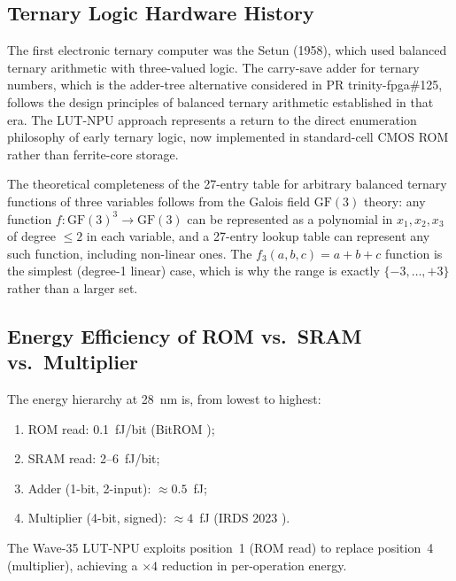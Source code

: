 \subsection{Ternary Logic Hardware History}

The first electronic ternary computer was the Setun (1958), which used
balanced ternary arithmetic with three-valued logic.  The carry-save adder
for ternary numbers, which is the adder-tree alternative considered in
PR trinity-fpga\#125, follows the design principles of balanced ternary
arithmetic established in that era.  The LUT-NPU approach represents a
return to the direct enumeration philosophy of early ternary logic, now
implemented in standard-cell CMOS ROM rather than ferrite-core storage.

The theoretical completeness of the 27-entry table for arbitrary balanced
ternary functions of three variables follows from the Galois field $\mathrm{GF}(3)$
theory: any function $f : \mathrm{GF}(3)^3 \to \mathrm{GF}(3)$ can be
represented as a polynomial in $x_1, x_2, x_3$ of degree $\leq 2$ in each
variable, and a 27-entry lookup table can represent any such function,
including non-linear ones.  The $f_3(a,b,c) = a+b+c$ function is the
simplest (degree-1 linear) case, which is why the range is exactly $\{-3,\ldots,+3\}$
rather than a larger set.

\subsection{Energy Efficiency of ROM vs.\ SRAM vs.\ Multiplier}

The energy hierarchy at 28~nm is, from lowest to highest:
\begin{enumerate}
  \item ROM read: 0.1~fJ/bit (BitROM \cite{bitrom_2025});
  \item SRAM read: 2--6~fJ/bit;
  \item Adder (1-bit, 2-input): $\approx 0.5$~fJ;
  \item Multiplier (4-bit, signed): $\approx 4$~fJ (IRDS 2023 \cite{irds2023}).
\end{enumerate}
The Wave-35 LUT-NPU exploits position~1 (ROM read) to replace position~4
(multiplier), achieving a $\times 4$ reduction in per-operation energy.

